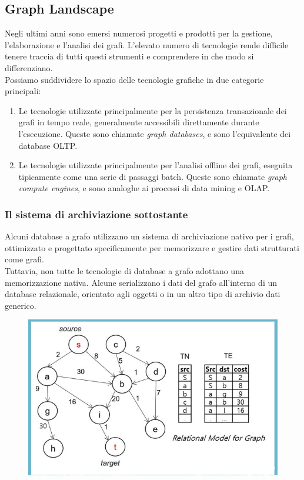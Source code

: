 \newpage

\subsection{Graph Landscape}
Negli ultimi anni sono emersi numerosi progetti e prodotti per la gestione, l'elaborazione e l'analisi dei grafi. L'elevato numero di tecnologie rende difficile tenere traccia di tutti questi strumenti e comprendere in che modo si differenziano.
\\
Possiamo suddividere lo spazio delle tecnologie grafiche in due categorie principali:

\begin{enumerate}
    \item Le tecnologie utilizzate principalmente per la persistenza transazionale dei grafi in tempo reale, generalmente accessibili direttamente durante l’esecuzione. Queste sono chiamate \emph{graph databases}, e sono l’equivalente dei database OLTP.
    \item Le tecnologie utilizzate principalmente per l'analisi offline dei grafi, eseguita tipicamente come una serie di passaggi batch. Queste sono chiamate \emph{graph compute engines}, e sono analoghe ai processi di data mining e OLAP.
\end{enumerate}
\subsubsection*{Il sistema di archiviazione sottostante}

Alcuni database a grafo utilizzano un sistema di archiviazione nativo per i grafi, ottimizzato e progettato specificamente per memorizzare e gestire dati strutturati come grafi. \\
Tuttavia, non tutte le tecnologie di database a grafo adottano una memorizzazione nativa. Alcune serializzano i dati del grafo all'interno di un database relazionale, orientato agli oggetti o in un altro tipo di archivio dati generico.
\\
\begin{figure}[th]
    \centering
    \includegraphics[width=0.5\linewidth]{GraphDatabase//img/immagine1.png}
\end{figure}

